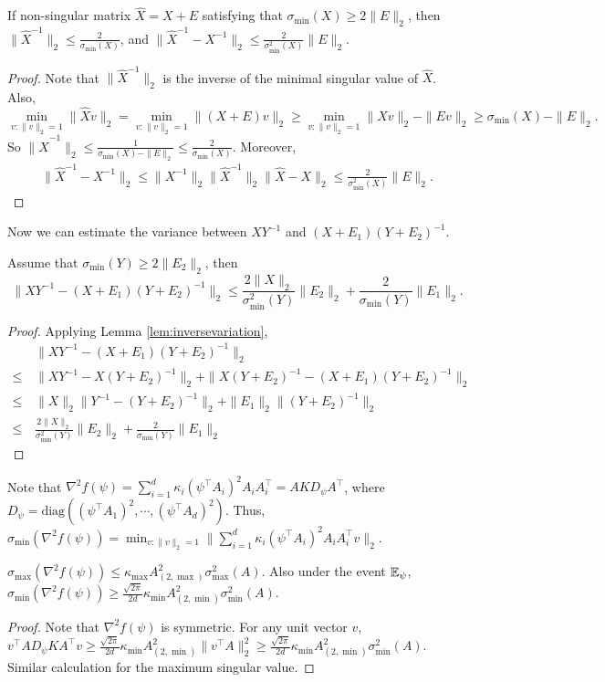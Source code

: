 \begin{lemma}
\label{lem:inversevariation}
If non-singular matrix $\widehat{X} = X+E$ satisfying that $\sigma_{\min}(X)\ge2\|E\|_2$, then $\|\widehat{X}^{-1}\|_2 \le \frac{2}{\sigma_{\min}(X)}$, and $\|\widehat{X}^{-1} - X^{-1} \|_2 \le \frac{2}{\sigma_{\min}^2(X)}\|E\|_2$.
\end{lemma} 
\begin{proof}
Note that $\|\widehat{X}^{-1}\|_2$ is the inverse of the minimal singular value of $\widehat{X}$. Also, 
\[
 \min_{v:\|v\|_2=1} \|\widehat{X}v\|_2 = \min_{v:\|v\|_2=1}\|(X+E)v\|_2 \ge \min_{v:\|v\|_2=1} \|Xv\|_2 - \|Ev\|_2 \ge \sigma_{\min}(X) - \|E\|_2.
\]
So $\|\widehat{X}^{-1}\|_2 \le \frac{1}{\sigma_{\min}(X) - \|E\|_2} \le \frac{2}{\sigma_{\min}(X)}$. Moreover,
\begin{align*}
\|\widehat{X}^{-1} - X^{-1} \|_2 \le \|X^{-1}\|_2\|\widehat{X}^{-1}\|_2\|\widehat{X} - X\|_2
\le \frac{2}{\sigma_{\min}^2(X)}\|E\|_2.
\end{align*}
\end{proof}
Now we can estimate the variance between $XY^{-1}$ and $(X+E_1)(Y+E_2)^{-1}$.
\begin{lemma}
\label{lem:Mvariation}
Assume that $\sigma_{\min}(Y)\ge2\|E_2\|_2$, then
\[
\| XY^{-1} - (X+E_1)(Y+E_2)^{-1}\|_2 \le \frac{2\|X\|_2}{\sigma_{\min}^2(Y)}\|E_2\|_2 + \frac{2}{\sigma_{\min}(Y)}\|E_1\|_2.
\]
\end{lemma}
\begin{proof}
Applying Lemma \ref{lem:inversevariation},
\begin{align*}
	& \| XY^{-1} - (X+E_1)(Y+E_2)^{-1}\|_2 \\
\le\, & \| XY^{-1} - X(Y+E_2)^{-1}\|_2 + \| X(Y+E_2)^{-1} - (X+E_1)(Y+E_2)^{-1}\|_2 \\
\le\, & \|X\|_2\| Y^{-1} - (Y+E_2)^{-1}\|_2 + \|E_1\|_2\|(Y+E_2)^{-1}\|_2\\
\le\, & \frac{2\|X\|_2}{\sigma_{\min}^2(Y)}\|E_2\|_2 + \frac{2}{\sigma_{\min}(Y)}\|E_1\|_2
\end{align*}
\end{proof}


Note that $\nabla^2f(\psi) = \sum_{i=1}^{d} \kappa_i(\psi^{\top}A_i)^2A_iA_i^{\top} = AKD_{\psi}A^{\top}$,  where $D_{\psi} = \text{diag}\left((\psi^{\top}A_1)^2,\cdots, (\psi^{\top}A_d)^2\right)$. 
Thus, $\sigma_{\min}(\nabla^2f(\psi)) = \min_{v:\|v\|_2=1}\|\sum_{i=1}^{d} \kappa_i(\psi^{\top}A_i)^2A_iA_i^{\top}v\|_2$. 
\begin{lemma}
\label{lem:boundsigmaminnabla}
$\sigma_{\max}(\nabla^2f(\psi)) \le \kappa_{\max}A^2_{(2,\max)}\sigma_{\max}^2(A)$. 
Also under the event $\mathbb{E}_{\psi}$, $\sigma_{\min}(\nabla^2f(\psi)) \ge \frac{\sqrt{2\pi}}{2d}\kappa_{\min}A^2_{(2,\min)}\sigma_{\min}^2(A)$.
\end{lemma}
\begin{proof}
Note that $\nabla^2f(\psi)$ is symmetric. 
For any unit vector $v$, $v^{\top}AD_{\psi}KA^{\top}v \ge \frac{\sqrt{2\pi}}{2d}\kappa_{\min} A^2_{(2,\min)}\|v^{\top}A\|_2^2 \ge \frac{\sqrt{2\pi}}{2d}\kappa_{\min}A^2_{(2,\min)}\sigma_{\min}^2(A)$. Similar calculation for the maximum singular value.
\end{proof}

